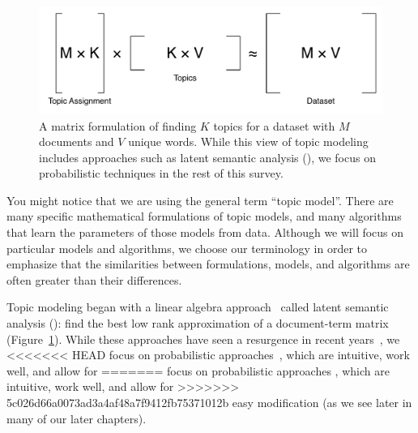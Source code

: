 \begin{center}
\begin{figure}
  \begin{center}
  \includegraphics[width=.8\linewidth]{figures/matrix_factorization}
  \end{center}

  \caption{A matrix formulation of finding $K$ topics for a dataset
    with $M$ documents and $V$ unique words.  While this
    view of topic modeling includes approaches such as latent semantic
    analysis (), we focus on probabilistic techniques in the
    rest of this survey.}
  \label{fig:matrix_topics}
\end{figure}
\end{center}

You might notice that we are using the general term ``topic model''.
There are many specific mathematical formulations of topic models, and many algorithms that learn the parameters of those models from data.
Although we will focus on particular models and algorithms, we choose our terminology in order to emphasize that the similarities between formulations, models, and algorithms are often greater than their differences.

Topic modeling began with a linear algebra approach~\citep{deerwester-90} called
latent semantic analysis (): find the best low rank approximation of a
document-term matrix (Figure~\ref{fig:matrix_topics}).  While these approaches
have seen a resurgence in recent years~\citep{anandkumar-12:lda,arora-13}, we
<<<<<<< HEAD
focus on probabilistic approaches~\citep{hofmann-99,papadimitriou-00,blei-03}, which are intuitive, work well, and allow for
=======
focus on probabilistic approaches \citep{hofmann-99,papadimitriou-00,blei-03}, 
which are intuitive, work well, and allow for
>>>>>>> 5c026d66a0073ad3a4af48a7f9412fb75371012b
easy modification (as we see later in many of our later chapters).

